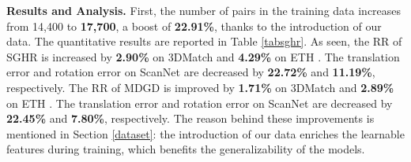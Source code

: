 \noindent\textbf{Results and Analysis.} First, the number of pairs in the training data increases from 14,400 to \textbf{17,700}, a boost of \textbf{22.91\%}, thanks to the introduction of our data. 
%
The quantitative results are reported in Table \ref{tabsghr}. 
%
As seen, the RR of SGHR \cite{sghr} is increased by \textbf{2.90\%} on 3DMatch \cite{3dmatch} and \textbf{4.29\%} on ETH \cite{eth}. The translation error and rotation error on ScanNet \cite{scan} are decreased by \textbf{22.72\%} and \textbf{11.19\%}, respectively.
%
The RR of MDGD \cite{mdgd} is improved by \textbf{1.71\%} on 3DMatch \cite{3dmatch} and \textbf{2.89\%} on ETH \cite{eth}. The translation error and rotation error on ScanNet \cite{scan} are decreased by \textbf{22.45\%} and \textbf{7.80\%}, respectively.
%
The reason behind these improvements is mentioned in Section \ref{dataset}: the introduction of our data enriches the learnable features during training, which benefits the generalizability of the models.

\begin{table*}[htb]

\caption{Quantitative evaluation of the enhancement of SGHR \cite{sghr} and MDGD \cite{mdgd} due to the addition of Livox-3DMatch to the training.}

\centering
\label{tabsghr}

\end{table*}

